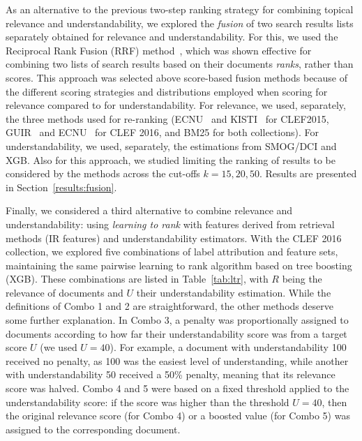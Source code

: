 As an alternative to the previous two-step ranking strategy for combining topical relevance and understandability, we explored the \textit{fusion} of two search results lists separately obtained for relevance and understandability. For this, we used the Reciprocal Rank Fusion (RRF) method~\cite{cormack09}, which was shown effective for combining two lists of search results based on their documents \textit{ranks}, rather than scores. This approach was selected above score-based fusion methods because of the different scoring strategies and distributions employed when scoring for relevance compared to for understandability. For relevance, we used, separately, the three methods used for re-ranking (ECNU~\cite{song15} and KISTI~\cite{oh15} for CLEF2015, GUIR~\cite{soldaini16} and ECNU~\cite{song16} for CLEF 2016, and BM25 for both collections). For understandability, we used, separately, the estimations from SMOG/DCI and XGB. Also for this approach, we studied limiting the ranking of results to be considered by the methods across the cut-offs $k=15, 20, 50$. Results are presented in Section~\ref{results:fusion}.



Finally, we considered a third alternative to combine relevance and understandability: using \textit{learning to rank} with features derived from retrieval methods (IR features) and understandability estimators.
With the CLEF 2016 collection, we explored five combinations of label attribution and feature sets, maintaining the same pairwise learning to rank algorithm based on tree boosting (XGB).
These combinations are listed in Table~\ref{tab:ltr}, with $R$ being the relevance of documents and $U$ their understandability estimation. While the definitions of Combo 1 and 2 are straightforward, the other methods deserve some further explanation. In Combo 3, a penalty was proportionally assigned to documents according to how far their understandability score was from a target score $U$ (we used $U=40$). For example, a document with understandability 100 received no penalty, as 100 was the easiest level of understanding, while another with understandability 50 received a 50\% penalty, meaning that its relevance score was halved. Combo 4 and 5 were based on a fixed threshold applied to the understandability score: if the score was higher than the threshold $U=40$, then the original relevance score (for Combo 4) or a boosted value (for Combo 5) was assigned to the corresponding document.


